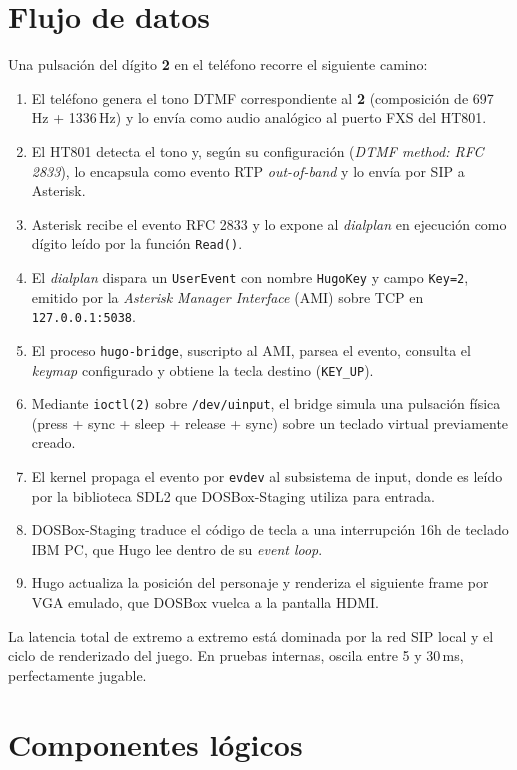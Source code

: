 \section{Flujo de datos}

Una pulsación del dígito \textbf{2} en el teléfono recorre el siguiente camino:

\begin{enumerate}
  \item El teléfono genera el tono DTMF correspondiente al \textbf{2} (composición de 697\,Hz + 1336\,Hz) y lo envía como audio analógico al puerto FXS del HT801.
  \item El HT801 detecta el tono y, según su configuración (\emph{DTMF method: RFC 2833}), lo encapsula como evento RTP \emph{out-of-band} y lo envía por SIP a Asterisk.
  \item Asterisk recibe el evento RFC 2833 y lo expone al \emph{dialplan} en ejecución como dígito leído por la función \texttt{Read()}.
  \item El \emph{dialplan} dispara un \texttt{UserEvent} con nombre \texttt{HugoKey} y campo \texttt{Key=2}, emitido por la \emph{Asterisk Manager Interface} (AMI) sobre TCP en \texttt{127.0.0.1:5038}.
  \item El proceso \texttt{hugo-bridge}, suscripto al AMI, parsea el evento, consulta el \emph{keymap} configurado y obtiene la tecla destino (\texttt{KEY\_UP}).
  \item Mediante \texttt{ioctl(2)} sobre \texttt{/dev/uinput}, el bridge simula una pulsación física (press + sync + sleep + release + sync) sobre un teclado virtual previamente creado.
  \item El kernel propaga el evento por \texttt{evdev} al subsistema de input, donde es leído por la biblioteca SDL2 que DOSBox-Staging utiliza para entrada.
  \item DOSBox-Staging traduce el código de tecla a una interrupción 16h de teclado IBM PC, que Hugo lee dentro de su \emph{event loop}.
  \item Hugo actualiza la posición del personaje y renderiza el siguiente frame por VGA emulado, que DOSBox vuelca a la pantalla HDMI.
\end{enumerate}

La latencia total de extremo a extremo está dominada por la red SIP local y el ciclo de renderizado del juego. En pruebas internas, oscila entre 5 y 30\,ms, perfectamente jugable.

\section{Componentes lógicos}

